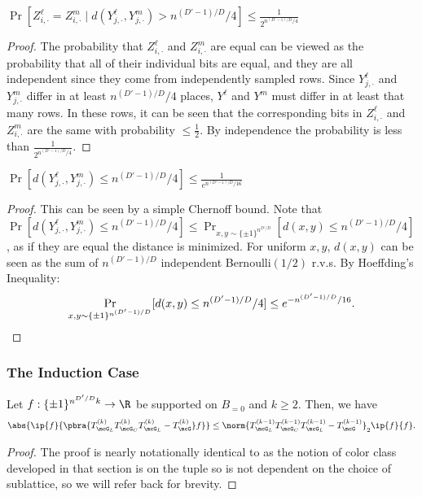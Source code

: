 \begin{lemma}\label{lem:given Y far}
    $\Pr[Z^\ell_{i, \cdot} = Z^m_{i, \cdot} \mid d(Y^\ell_{j, \cdot}, Y^m_{j, \cdot}) > n^{(D'-1)/D}/4] \leq \frac{1}{2^{n^{(D'-1)/D}/4}}$
\end{lemma}
\begin{proof}
    The probability that $Z^\ell_{i, \cdot}$ and $Z^m_{i, \cdot}$ are equal can be viewed as the probability that all of their individual bits are equal, and they are all independent since they come from independently sampled rows. Since $Y^\ell_{j, \cdot}$ and $Y^m_{j, \cdot}$ differ in at least $n^{(D'-1)/D}/4$ places, $Y^\ell$ and $Y^m$ must differ in at least that many rows. In these rows, it can be seen that the corresponding bits in $Z^\ell_{i, \cdot}$ and $Z^m_{i, \cdot}$ are the same with probability $\leq \frac{1}{2}$. By independence the probability is less than $\frac{1}{2^{n^{(D'-1)/D}/4}}$. 
\end{proof}

\begin{lemma}\label{lem:Y probably far}
    $\Pr[d(Y^\ell_{j, \cdot}, Y^m_{j, \cdot}) \leq n^{(D'-1)/D}/4] \leq \frac{1}{e^{n^{(D'-1)/D}/16}}$
\end{lemma}
\begin{proof}
    This can be seen by a simple Chernoff bound. Note that $\Pr[d(Y^\ell_{j, \cdot}, Y^m_{j, \cdot}) \leq n^{(D'-1)/D}/4] \leq \Pr_{x, y \sim \{\pm1\}^{n^{D'/D}}}[d(x, y) \leq n^{(D'-1)/D}/4]$, as if they are equal the distance is minimized. For uniform $x,y$, $d(x,y)$ can be seen as the sum of $n^{(D'-1)/D}$ independent Bernoulli$(1/2)$ r.v.s. By Hoeffding's Inequality:
    \begin{equation*}
        \Pr_{x,y \sim \{\pm1\}^{n^{(D'-1)/D}}}[d(x,y) \leq n^{(D'-1)/D}/4] \leq e^{-n^{(D'-1)/D}/16}.\qedhere
    \end{equation*}
\end{proof}

\subsubsection{The Induction Case}

\begin{lemma}
Let $f : \{\pm1\}^{n^{D'/D}k} \to \R$ be supported on $B_{=0}$ and $k \geq 2$. Then, we have
\[ 
\abs{\ip{f}{\pbra{T_{\mcG_L}^{(k)}T_{\mcG_C}^{(k)}T_{\mcG_L}^{(k)} - T_\mcG^{(k)}}f}} \le \norm{T_{\mcG_L}^{(k-1)}T_{\mcG_C}^{(k-1)}T_{\mcG_L}^{(k-1)} - T_{\mcG}^{(k-1)}}_{2} \ip{f}{f}. 
\]
\end{lemma}

\begin{proof}
    The proof is nearly notationally identical to  as the notion of color class developed in that section is on the tuple so is not dependent on the choice of sublattice, so we will refer back for brevity.
\end{proof}